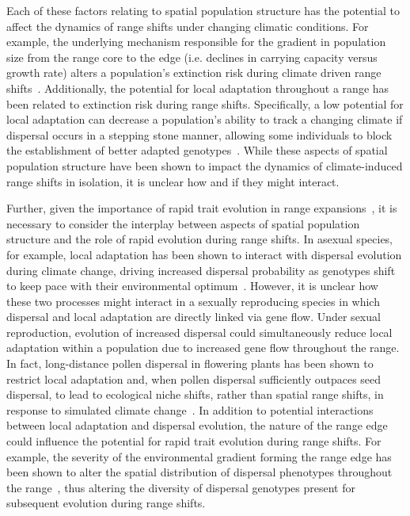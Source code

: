 \documentclass[12pt, oneside]{article}
\begin{document}
Each of these factors relating to spatial population structure has the potential to affect the dynamics of range shifts under changing climatic conditions. For example, the underlying mechanism responsible for the gradient in population size from the range core to the edge (i.e. declines in carrying capacity versus growth rate) alters a population's extinction risk during climate driven range shifts~\citep{henry2013eco}. Additionally, the potential for local adaptation throughout a range has been related to extinction risk during range shifts. Specifically, a low potential for local adaptation can decrease a population's ability to track a changing climate if dispersal occurs in a stepping stone manner, allowing some individuals to block the establishment of better adapted genotypes~\citep{atkins2010local}. While these aspects of spatial population structure have been shown to impact the dynamics of climate-induced range shifts in isolation, it is unclear how and if they might interact. 

Further, given the importance of rapid trait evolution in range expansions~\citep{weiss2017rapid, ochocki2017rapid, szHucs2017rapid, shaw2015dispersal, phillips2015evolutionary}, it is necessary to consider the interplay between aspects of spatial population structure and the role of rapid evolution during range shifts. In asexual species, for example, local adaptation has been shown to interact with dispersal evolution during climate change, driving increased dispersal probability as genotypes shift to keep pace with their environmental optimum~\citep{hargreaves2015fitness}. However, it is unclear how these two processes might interact in a sexually reproducing species in which dispersal and local adaptation are directly linked via gene flow. Under sexual reproduction, evolution of increased dispersal could simultaneously reduce local adaptation within a population due to increased gene flow throughout the range. In fact, long-distance pollen dispersal in flowering plants has been shown to restrict local adaptation and, when pollen dispersal sufficiently outpaces seed dispersal, to lead to ecological niche shifts, rather than spatial range shifts, in response to simulated climate change~\citep{aguilee2016pollen}. In addition to potential interactions between local adaptation and dispersal evolution, the nature of the range edge could influence the potential for rapid trait evolution during range shifts. For example, the severity of the environmental gradient forming the range edge has been shown to alter the spatial distribution of dispersal phenotypes throughout the range~\citep{henry2013eco, hargreaves2014evolution}, thus altering the diversity of dispersal genotypes present for subsequent evolution during range shifts.
\end{document}
